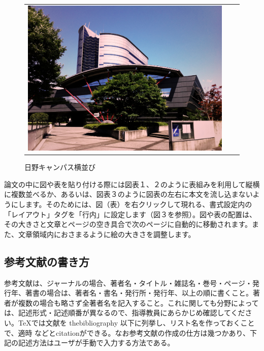 \documentclass[a4paper]{jsarticle}
\begin{document}
\begin{figure}[tb]
\begin{center}
\begin{tabular}{ccc}
\begin{minipage}{0.3\hsize}
      \includegraphics[width=\hsize]{./images/sample.jpg}
    \end{minipage}

  \end{tabular}
    \caption{日野キャンパス横並び}
    \label{fig:tmu_hino_yokonarabi}
  \end{center}
\end{figure}


論文の中に図や表を貼り付ける際には図表１、２のように表組みを利用して縦横に複数並べるか、あるいは、図表３のように図表の左右に本文を流し込まないようにします。そのためには、図（表）を右クリックして現れる、書式設定内の「レイアウト」タグを「行内」に設定します（図３を参照）。図や表の配置は、その大きさと文章とページの空き具合で次のページに自動的に移動されます。また、文章領域内におさまるように絵の大きさを調整します。

\subsection{参考文献の書き方}
参考文献は、ジャーナルの場合、著者名・タイトル・雑誌名・巻号・ページ・発行年、著書の場合は、著者名・書名・発行所・発行年、以上の順に書くこと。著者が複数の場合も略さず全著者名を記入すること。これに関しても分野によっては、記述形式・記述順番が異なるので、指導教員にあらかじめ確認してください。\TeX では文献を thebibliography 以下に列挙し、リスト名を作っておくことで、適時\cite{sample} などとcitationができる。なお参考文献の作成の仕方は幾つかあり、下記の記述方法はユーザが手動で入力する方法である。
\end{document}

